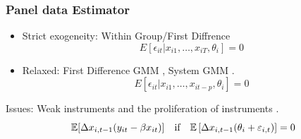 \documentclass[10pt,mathserif,aspectratio=169]{beamer}
\begin{document}


\begin{frame}
  \frametitle{Panel data Estimator}
  \begin{itemize}\itemsep=12pt
    \item Strict exogeneity: Within Group/First Diffrence
          \begin{equation*}
            E[\epsilon_{it}|x_{i1},\ldots, x_{iT},\theta_i]=0
          \end{equation*}
    \item Relaxed: First Difference GMM \cite{arellano1991some}, System GMM
          \cite{arellano1995another,blundell1998initial}.
          \begin{equation*}
            E[\epsilon_{it}|x_{i1},\ldots, x_{it-p},\theta_i]=0
          \end{equation*}
  \end{itemize}

  Issues: Weak instruments \cite{blundell_bond_1998} and the proliferation of
  instruments \cite{roodman2007short}.
  \begin{equation*}
    \mathbb{E}[\Delta x_{i,t-1}(y_{it}-\beta x_{it})] \quad \text{if}\quad \mathbb{E}\left[\Delta x_{i,t-1}(\theta_i+\varepsilon_{i,t})\right]=0
  \end{equation*}
\end{frame}
\end{document}
